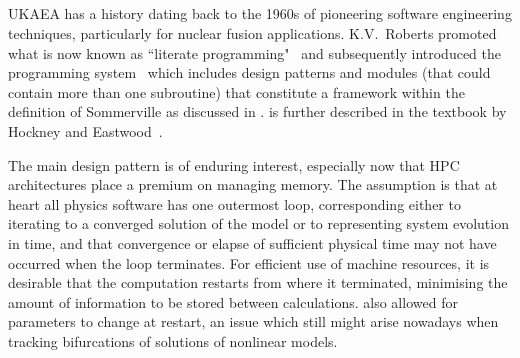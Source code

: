 \subsection{}\label{sec:olympus}

UKAEA has a history dating back to the 1960s of pioneering software engineering
techniques, particularly for nuclear fusion applications. K.V.~Roberts promoted
what is now known as ``literate programming"~\cite{Ro69Publ} and subsequently
introduced the  programming system~\cite{Ch74Stan} which includes design patterns
and modules (that could contain more than one subroutine) that constitute a framework within the definition
of Sommerville as discussed in .  is further described
in the textbook by Hockney and Eastwood~\cite[\S\,3]{hockneyeastwood}.

The main  design pattern is of enduring interest, especially now that
HPC architectures place a premium on managing memory. The assumption is that
at heart all physics software has one outermost loop, corresponding either
to iterating
to a converged solution of the model or to representing system evolution in time, and that
convergence or elapse of sufficient physical time may not have occurred
when the loop terminates. For efficient use of machine resources, it is 
desirable that the computation restarts from where it terminated, 
minimising the amount of information to be stored between calculations.
 also allowed for parameters to change at restart, an
issue which still might arise nowadays when tracking bifurcations of solutions of
nonlinear models.

